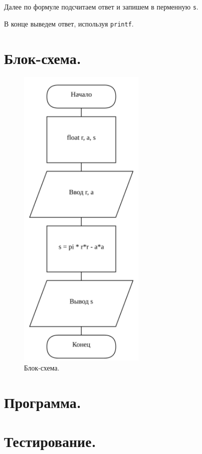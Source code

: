 Далее по формуле подсчитаем ответ и запишем в перменную \texttt{s}.

В конце выведем ответ, используя \texttt{printf}.

\section{Блок-схема.}

\begin{figure}[h] %
    \centering %
    \includegraphics[height=15cm]{scheme} 
    \caption{Блок-схема.} %
    \label{fig:scheme} %
\end{figure}


\section{Программа.}

% 


\section{Тестирование.}

